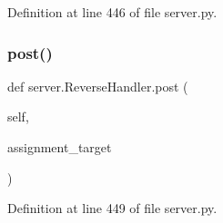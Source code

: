 Definition at line 446 of file server.\+py.

\mbox{\label{classserver_1_1ReverseHandler_a3a51f6fb8e9da913acf8bb9719bebbe2}} 
\subsubsection{\texorpdfstring{post()}{post()}}
{\footnotesize\ttfamily def server.\+Reverse\+Handler.\+post (\begin{DoxyParamCaption}\item[{}]{self,  }\item[{}]{assignment\+\_\+target }\end{DoxyParamCaption})}



Definition at line 449 of file server.\+py.



